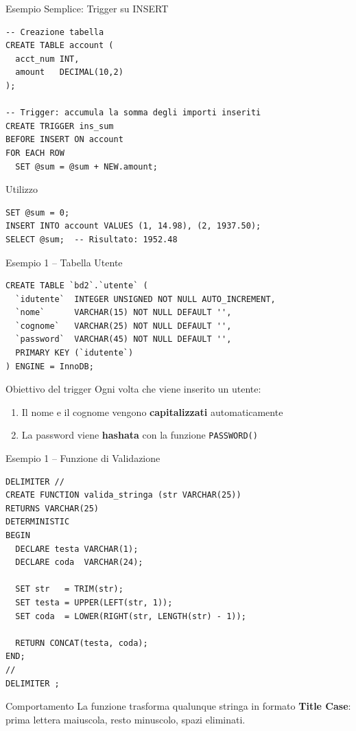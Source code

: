 \documentclass[aspectratio=169]{beamer}
\begin{document}
\begin{frame}[fragile]{Esempio Semplice: Trigger su INSERT}
  \begin{lstlisting}[style=sqlstyle]
-- Creazione tabella
CREATE TABLE account (
  acct_num INT,
  amount   DECIMAL(10,2)
);

-- Trigger: accumula la somma degli importi inseriti
CREATE TRIGGER ins_sum
BEFORE INSERT ON account
FOR EACH ROW
  SET @sum = @sum + NEW.amount;
  \end{lstlisting}
  \begin{block}{Utilizzo}
    \begin{lstlisting}[style=sqlstyle]
SET @sum = 0;
INSERT INTO account VALUES (1, 14.98), (2, 1937.50);
SELECT @sum;  -- Risultato: 1952.48
    \end{lstlisting}
  \end{block}
\end{frame}

\begin{frame}[fragile]{Esempio 1 -- Tabella Utente}
  \begin{lstlisting}[style=sqlstyle]
CREATE TABLE `bd2`.`utente` (
  `idutente`  INTEGER UNSIGNED NOT NULL AUTO_INCREMENT,
  `nome`      VARCHAR(15) NOT NULL DEFAULT '',
  `cognome`   VARCHAR(25) NOT NULL DEFAULT '',
  `password`  VARCHAR(45) NOT NULL DEFAULT '',
  PRIMARY KEY (`idutente`)
) ENGINE = InnoDB;
  \end{lstlisting}
  \begin{block}{Obiettivo del trigger}
    Ogni volta che viene inserito un utente:
    \begin{enumerate}
      \item Il nome e il cognome vengono \textbf{capitalizzati} automaticamente
      \item La password viene \textbf{hashata} con la funzione \texttt{PASSWORD()}
    \end{enumerate}
  \end{block}
\end{frame}

\begin{frame}[fragile]{Esempio 1 -- Funzione di Validazione}
  \begin{lstlisting}[style=sqlstyle]
DELIMITER //
CREATE FUNCTION valida_stringa (str VARCHAR(25))
RETURNS VARCHAR(25)
DETERMINISTIC
BEGIN
  DECLARE testa VARCHAR(1);
  DECLARE coda  VARCHAR(24);

  SET str   = TRIM(str);
  SET testa = UPPER(LEFT(str, 1));
  SET coda  = LOWER(RIGHT(str, LENGTH(str) - 1));

  RETURN CONCAT(testa, coda);
END;
//
DELIMITER ;
  \end{lstlisting}
  \begin{block}{Comportamento}
    La funzione trasforma qualunque stringa in formato \textbf{Title Case}:
    prima lettera maiuscola, resto minuscolo, spazi eliminati.
  \end{block}
\end{frame}
\end{document}
